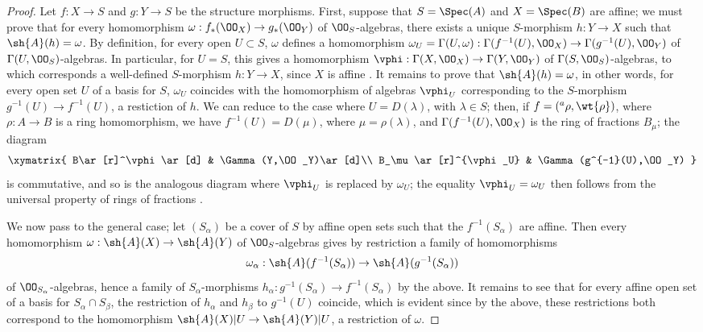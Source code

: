 \begin{proof}
\label{proof-2.1.2.7}
Let $f:X\to S$ and $g:Y\to S$ be the structure morphisms.
First, suppose that $S=\Spec(A)$ and $X=\Spec(B)$ are affine; we must prove that for every homomorphism $\omega:f_*(\OO_X)\to g_*(\OO_Y)$ of $\OO_S$-algebras, there exists a unique $S$-morphism $h:Y\to X$ such that $\sh{A}(h)=\omega$.
By definition, for every open $U\subset S$, $\omega$ defines a homomorphism $\omega_U=\Gamma(U,\omega):\Gamma(f^{-1}(U),\OO_X)\to\Gamma(g^{-1}(U),\OO_Y)$ of $\Gamma(U,\OO_S)$-algebras.
In particular, for $U=S$, this gives a homomorphism $\vphi:\Gamma(X,\OO_X)\to\Gamma(Y,\OO_Y)$ of $\Gamma(S,\OO_S)$-algebras, to which corresponds a well-defined $S$-morphism $h:Y\to X$, since $X$ is affine .
It remains to prove that $\sh{A}(h)=\omega$, in other words, for every open set $U$ of a basis for $S$, $\omega_U$ coincides with the homomorphism of algebras $\vphi_U$ corresponding to the $S$-morphism $g^{-1}(U)\to f^{-1}(U)$, a restiction of $h$.
We can reduce to the case where $U=D(\lambda)$, with $\lambda\in S$; then, if $f=({}^a\rho,\wt{\rho})$, where $\rho:A\to B$ is a ring homomorphism, we have $f^{-1}(U)=D(\mu)$, where $\mu=\rho(\lambda)$, and $\Gamma(f^{-1}(U),\OO_X)$ is the ring of fractions $B_\mu$; the diagram
\[
  \xymatrix{
    B\ar[r]^\vphi\ar[d] &
    \Gamma(Y,\OO_Y)\ar[d]\\
    B_\mu\ar[r]^{\vphi_U} &
    \Gamma(g^{-1}(U),\OO_Y)
  }
\]
is commutative, and so is the analogous diagram where $\vphi_U$ is replaced by $\omega_U$; the equality $\vphi_U=\omega_U$ then follows from the universal property of rings of fractions .

We now pass to the general case; let $(S_\alpha)$ be a cover of $S$ by affine open sets
such that the $f^{-1}(S_\alpha)$ are affine.
Then every homomorphism $\omega:\sh{A}(X)\to\sh{A}(Y)$ of $\OO_S$-algebras gives by restriction a family of homomorphisms
\[
  \omega_\alpha:\sh{A}(f^{-1}(S_\alpha))\to\sh{A}(g^{-1}(S_\alpha))
\]
of $\OO_{S_\alpha}$-algebras, hence a family of $S_\alpha$-morphisms $h_\alpha:g^{-1}(S_\alpha)\to f^{-1}(S_\alpha)$ by the above.
It remains to see that for every affine open set of a basis for $S_\alpha\cap S_\beta$, the restriction of $h_\alpha$ and $h_\beta$ to $g^{-1}(U)$ coincide, which is evident since by the above, these restrictions both correspond to the homomorphism $\sh{A}(X)|U\to\sh{A}(Y)|U$, a restriction of $\omega$.
\end{proof}

